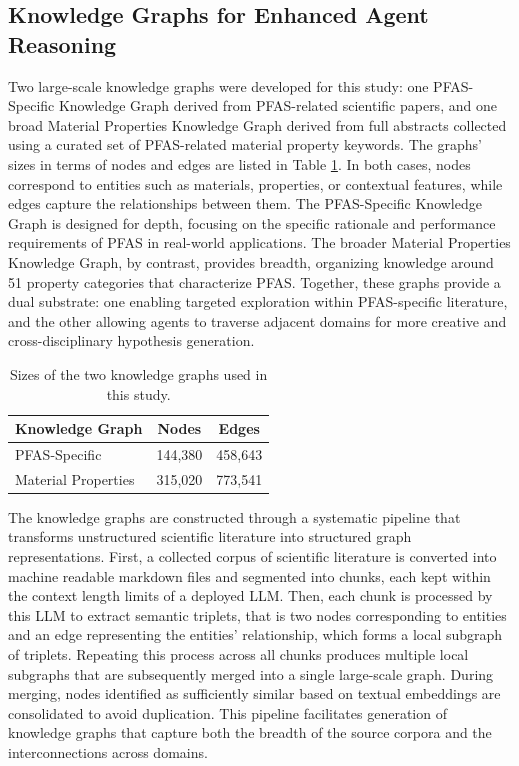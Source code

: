 \subsection{Knowledge Graphs for Enhanced Agent Reasoning}

Two large-scale knowledge graphs were developed for this study: one PFAS-Specific Knowledge Graph derived from PFAS-related scientific papers, and one broad Material Properties Knowledge Graph derived from full abstracts collected using a curated set of PFAS-related material property keywords. The graphs’ sizes in terms of nodes and edges are listed in Table \ref{tab:knowledge graph-sizes}. In both cases, nodes correspond to entities such as materials, properties, or contextual features, while edges capture the relationships between them. The PFAS-Specific Knowledge Graph is designed for depth, focusing on the specific rationale and performance requirements of PFAS in real-world applications. The broader Material Properties Knowledge Graph, by contrast, provides breadth, organizing knowledge around 51 property categories that characterize PFAS. Together, these graphs provide a dual substrate: one enabling targeted exploration within PFAS-specific literature, and the other allowing agents to traverse adjacent domains for more creative and cross-disciplinary hypothesis generation.

\begin{table}[H]
\centering
\caption{Sizes of the two knowledge graphs used in this study.}
\label{tab:knowledge graph-sizes}
\begin{tabular}{lcc}
\hline
\textbf{Knowledge Graph} & \textbf{Nodes} & \textbf{Edges} \\
\hline
PFAS-Specific            & 144,380        & 458,643 \\
Material Properties      & 315,020        & 773,541 \\
\hline
\end{tabular}
\end{table} 

The knowledge graphs are constructed through a systematic pipeline that transforms unstructured scientific literature into structured graph representations. First, a collected corpus of scientific literature is converted into machine readable markdown files and segmented into chunks, each kept within the context length limits of a deployed LLM. Then, each chunk is processed by this LLM to extract semantic triplets, that is two nodes corresponding to entities and an edge representing the entities' relationship, which forms a local subgraph of triplets. Repeating this process across all chunks produces multiple local subgraphs that are subsequently merged into a single large-scale graph. During merging, nodes identified as sufficiently similar based on textual embeddings are consolidated to avoid duplication. This pipeline facilitates generation of knowledge graphs that capture both the breadth of the source corpora and the interconnections across domains. 

